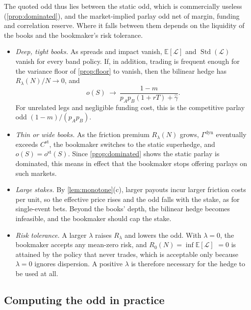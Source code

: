 \documentclass[11pt,a4paper]{article}
\theoremstyle{plain}
\theoremstyle{definition}
\theoremstyle{remark}
\newcommand{\E}{\mathbb{E}}
\newcommand{\1}{\mathbf{1}}
\begin{document}
The quoted odd thus lies between the static odd, which is commercially useless (\cref{prop:dominated}), and the market-implied parlay odd net of margin, funding and correlation reserve. Where it falls between them depends on the liquidity of the books and the bookmaker's risk tolerance.
\begin{itemize}
  \item \emph{Deep, tight books.} As spreads and impact vanish, $\E[\mathcal{L}]$ and $\operatorname{Std}(\mathcal{L})$ vanish for every band policy. If, in addition, trading is frequent enough for the variance floor of \cref{prop:floor} to vanish, then the bilinear hedge has $R_\lambda(N)/N\to 0$, and
  \[
  o(S)\ \to\ \frac{1-m}{p_Ap_B(1+rT)+\hat\gamma}.
  \]
  For unrelated legs and negligible funding cost, this is the competitive parlay odd $(1-m)/(p_Ap_B)$.
  \item \emph{Thin or wide books.} As the friction premium $R_\lambda(N)$ grows, $\Gamma^{\mathrm{dyn}}$ eventually exceeds $C^{\mathrm{st}}$, the bookmaker switches to the static superhedge, and $o(S) = o^{\mathrm{st}}(S)$. Since \cref{prop:dominated} shows the static parlay is dominated, this means in effect that the bookmaker stops offering parlays on such markets.
  \item \emph{Large stakes.} By \cref{lem:monotone}(c), larger payouts incur larger friction costs per unit, so the effective price rises and the odd falls with the stake, as for single-event bets. Beyond the books' depth, the bilinear hedge becomes infeasible, and the bookmaker should cap the stake.
  \item \emph{Risk tolerance.} A larger $\lambda$ raises $R_\lambda$ and lowers the odd. With $\lambda=0$, the bookmaker accepts any mean-zero risk, and $R_0(N) = \inf\E[\mathcal{L}]$ $=0$ is attained by the policy that never trades, which is acceptable only because $\lambda=0$ ignores dispersion. A positive $\lambda$ is therefore necessary for the hedge to be used at all.
\end{itemize}

\subsection{Computing the odd in practice}
\end{document}
